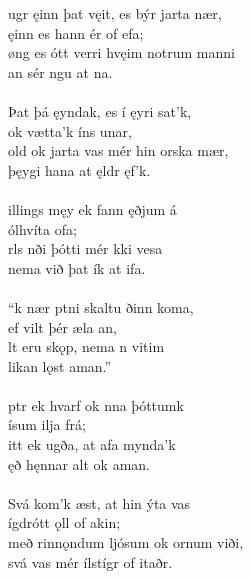 \bva {}ugr ęinn þat vęit, \hld es býr jarta nær, \\%
\ind ęinn es hann ér of efa; \\%
øng es ótt verri \hld hvęim notrum manni \\%
\ind an sér ngu at na.\\%

 \\

\bva Þat þá ęyndak, \hld es í ęyri sat'k, \\%
\ind ok vætta'k íns unar, \\%
old ok jarta \hld vas mér hin orska mær, \\%
\ind þęygi hana at ęldr ęf'k.\\%

 \\

\bva {}illings męy \hld ek fann ęðjum á \\%
\ind {}ólhvíta ofa; \\%
rls nði \hld þótti mér kki vesa \\%
\ind nema við þat ík at ifa.\\%

 \\

\bva “k nær ptni \hld skaltu ðinn koma, \\%
\ind ef vilt þér æla an, \\%
lt eru skǫp, \hld nema n vitim \\%
\ind {}likan lǫst aman.”\\%

 \\

\bva {}ptr ek hvarf \hld ok nna þóttumk \\%
\ind {}ísum ilja frá; \\%
itt ek ugða, \hld at afa mynda'k \\%
\ind {}ęð hęnnar alt ok aman.\\%

 \\

\bva Svá kom'k æst, \hld at hin ýta vas \\%
\ind {}ígdrótt ǫll of akin; \\%
með rinnǫndum ljósum \hld ok ornum viði, \\%
\ind svá vas mér ílstígr of itaðr.\\%


